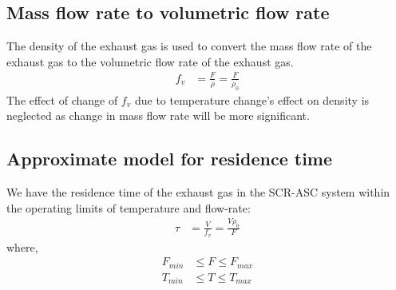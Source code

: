 \subsection{Mass flow rate to volumetric flow rate}
The density of the exhaust gas is used to convert the mass flow rate of the exhaust gas to the volumetric flow rate of the exhaust gas.
\begin{align}
    f_v &= \frac{F}{\rho} = \frac{F}{\rho_0}  \label{eqn::fv_approx}
\end{align}
The effect of change of $f_v$ due to temperature change's effect on density is neglected as change in mass flow rate will be more significant.

\subsection{Approximate model for residence time}
We have the residence time of the exhaust gas in the SCR-ASC system within the operating limits of temperature and flow-rate:
\begin{align}
    \tau &= \frac{V}{f_v} = \frac{V \rho_0}{F} \label{eqn::res_time}
\end{align}
where,
\begin{align*}
    F_{min} &\leq F \leq F_{max}\\
    T_{min} &\leq T \leq T_{max}
\end{align*}
